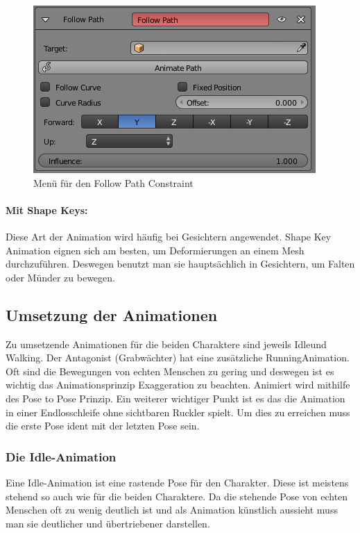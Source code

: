 \begin{figure}[H]
    \centering

    \includegraphics[width=.8\textwidth]{images/animation_path_constraint.png}
    \caption{Menü für den Follow Path Constraint}
\end{figure}

\paragraph{Mit Shape Keys:}
Diese Art der Animation wird häufig bei Gesichtern angewendet. Shape Key Animation eignen sich am besten, um Deformierungen an einem Mesh durchzuführen.
Deswegen benutzt man sie hauptsächlich in Gesichtern, um Falten oder Münder zu bewegen.
\citep{Blender:ShapeKeys}

\subsection{Umsetzung der Animationen}
Zu umsetzende Animationen für die beiden Charaktere sind jeweils \dq Idle\dq und \dq Walking\dq. Der Antagonist (Grabwächter)
hat eine zusätzliche \dq Running\dq Animation. Oft sind die Bewegungen von echten Menschen zu gering und deswegen ist es wichtig das Animationsprinzip \dq Exaggeration\dq
zu beachten. Animiert wird mithilfe des Pose to Pose Prinzip. Ein weiterer wichtiger Punkt ist es das die Animation in einer Endlosschleife
ohne sichtbaren Ruckler spielt. Um dies zu erreichen muss die erste Pose ident mit der letzten Pose sein.

\subsubsection{Die Idle-Animation}
Eine Idle-Animation ist eine rastende Pose für den Charakter. Diese ist meistens stehend so auch wie für die beiden Charaktere.
Da die stehende Pose von echten Menschen oft zu wenig deutlich ist und als Animation künstlich aussieht muss man sie deutlicher und übertriebener darstellen.

